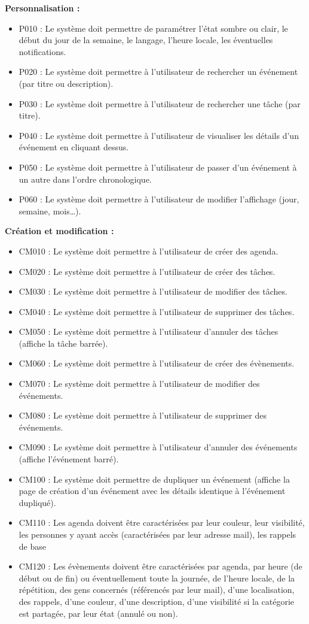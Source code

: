 \documentclass{article}
\begin{document}
\textbf{Personnalisation :}
\begin{itemize}
    \item P010 : Le système doit permettre de paramétrer l’état sombre ou clair, le début du jour de la semaine, le langage, l’heure locale, les éventuelles notifications.
    \item P020 : Le système doit permettre à l’utilisateur de rechercher un événement (par titre ou description).
    \item P030 : Le système doit permettre à l’utilisateur de rechercher une tâche (par titre).
    \item P040 : Le système doit permettre à l’utilisateur de visualiser les détails d’un événement en cliquant dessus.
    \item P050 : Le système doit permettre à l’utilisateur de passer d’un événement à un autre dans l’ordre chronologique.
    \item P060 : Le système doit permettre à l’utilisateur de modifier l’affichage (jour, semaine, mois…).
\end{itemize}
\textbf{Création et modification :}\\
\begin{itemize}
    \item CM010 : Le système doit permettre à l’utilisateur de créer des agenda.
    \item CM020 : Le système doit permettre à l’utilisateur de créer des tâches.
    \item CM030 : Le système doit permettre à l’utilisateur de modifier des tâches.
    \item CM040 : Le système doit permettre à l'utilisateur de supprimer des tâches.
    \item CM050 : Le système doit permettre à l'utilisateur d’annuler des tâches (affiche la tâche barrée).
    \item CM060 : Le système doit permettre à l’utilisateur de créer des évènements.
    \item CM070 : Le système doit permettre à l’utilisateur de modifier des événements.
    \item CM080 : Le système doit permettre à l'utilisateur de supprimer des événements.
    \item CM090 : Le système doit permettre à l'utilisateur d’annuler des événements (affiche l’événement barré).
    \item CM100 : Le système doit permettre de dupliquer un événement (affiche la page de création d’un événement avec les détails identique à l’événement dupliqué).
    \item CM110 : Les agenda doivent être caractérisées par leur couleur, leur visibilité, les personnes y ayant accès (caractérisées par leur adresse mail), les rappels de base
    \item CM120 : Les évènements doivent être caractérisées par agenda, par heure (de début ou de fin) ou éventuellement toute la journée, de l’heure locale, de la répétition, des gens concernés (référencés par leur mail), d’une localisation, des rappels, d’une couleur, d’une description, d’une visibilité si la catégorie est partagée, par leur état (annulé ou non).
\end{itemize}
\end{document}

